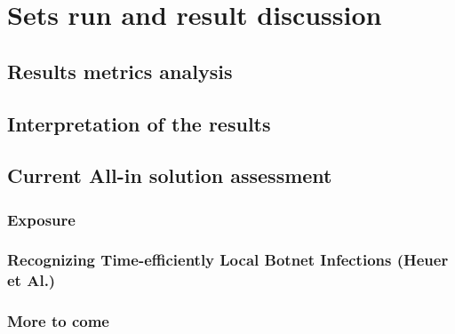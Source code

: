 
\chapter{Sets run and result discussion} %
\label{Sets run and result discussion} %

\section{Results metrics analysis}
\section{Interpretation of the results}

\section{Current All-in solution assessment}
\subsection{Exposure}
\subsection{Recognizing Time-efficiently Local Botnet Infections (Heuer et Al.)}
\subsection{More to come}
